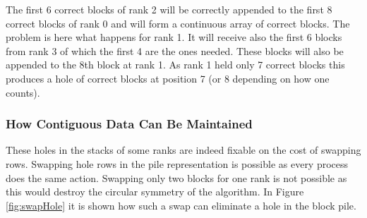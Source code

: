The first 6 correct blocks of rank 2 will be correctly appended to the first 8 correct blocks of rank 0 and will form a continuous array of correct blocks. The problem is here what happens for rank 1. It will receive also the first 6 blocks from rank 3 of which the first 4 are the ones needed. These blocks will also be appended to the 8th block at rank 1. As rank 1 held only 7 correct blocks this produces a hole of correct blocks at position 7 (or 8 depending on how one counts).

\subsubsection{How Contiguous Data Can Be Maintained}
These holes in the stacks of some ranks are indeed fixable on the cost of swapping rows. Swapping hole rows in the pile representation is possible as every process does the same action. Swapping only two blocks for one rank is not possible as this would destroy the circular symmetry of the algorithm. In Figure \ref{fig:swapHole} it is shown how such a swap can eliminate a hole in the block pile.
